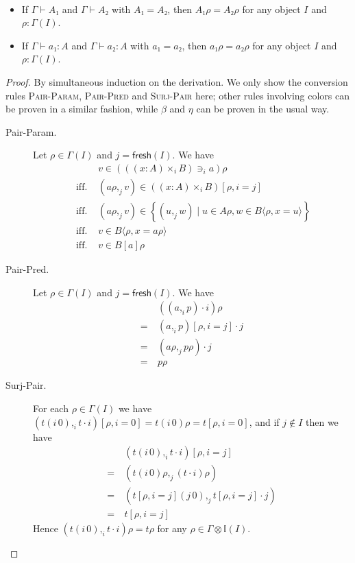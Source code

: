 \documentclass[english]{PaperTools/latex/lipics}
\newcommand\CTimes[2]{(#2) ×_{#1}}
\newcommand\param[1]{\!\cdot\!#1}
\newcommand\op[1]{∋_{#1}}
\def\fresh#1{\mathsf{fresh}(#1)}
\begin{document}
\begin{theorem}~
  \label{thm:convertible-in-model}
  \begin{itemize}
    \item If $Γ ⊢ A₁$ and $Γ ⊢ A₂$ with $A₁ = A₂$, then
      $A₁ρ = A₂ρ$ for any object $I$ and $ρ : Γ(I)$.
    \item If $Γ ⊢ a₁ : A$ and $Γ ⊢ a₂ : A$ with $a₁ = a₂$, then
      $a₁ρ = a₂ρ$ for any object $I$ and $ρ : Γ(I)$.
  \end{itemize}
\end{theorem}
\begin{proof}
  By simultaneous induction on the derivation.
  We only show the conversion rules \textsc{Pair-Param},
  \textsc{Pair-Pred} and \textsc{Surj-Pair} here; other rules involving
  colors can be proven in a similar fashion, while $β$ and $η$ can be
  proven in the usual way.

  \begin{description}
    \item[\sc Pair-Param.]
      Let $ρ ∈ Γ(I)$ and $j = \fresh I$.  We have
      \begin{align*}
        &v ∈ ({((x:A)\times_i B)} \op {i} a)ρ
        \\
        \text{ iff. }& (aρ ,_j v) ∈ (\CTimes i {x:A} B)[ρ,i=j]
        \\
        \text{ iff. }& (aρ ,_j v) ∈ \left\{ (u ,_j w) \mid u ∈ Aρ, w ∈ B⟨ρ,x=u⟩ \right\}
        \\
        \text{ iff. }& v ∈ B⟨ρ,x=aρ⟩
        \\
        \text{ iff. }& v ∈ B[a]ρ
      \end{align*}

    \item[\sc Pair-Pred.]
      Let $ρ ∈ Γ(I)$ and $j = \fresh I$.  We have
      \begin{align*}
         & ((a ,_i p) \param i)ρ
        \\=~& (a ,_i p)[ρ,i=j]·j
      \\=~& (aρ ,_j pρ) · j
      \\=~& pρ
      \end{align*}

    \item[\sc Surj-Pair.]
      For each $ρ ∈ Γ(I)$ we have
      $(t(i\,0) ,_i t·i)[ρ,i=0] = t(i\,0)ρ = t[ρ,i=0]$, and
      if $j ∉ I$ then we have
      \begin{align*}
        & (t(i\,0) ,_i t·i)[ρ,i=j]
        \\=~& (t(i\,0)ρ ,_j (t·i)ρ)
        \\=~& (t[ρ,i=j](j\,0) ,_j t[ρ,i=j]·j)
        \\=~& t[ρ,i=j]
      \end{align*}
      Hence $(t(i\,0) ,_i t·i)ρ = tρ$ for any $ρ ∈ Γ⊗𝕀(I)$.
      \qedhere
  \end{description}
\end{proof}
\end{document}
